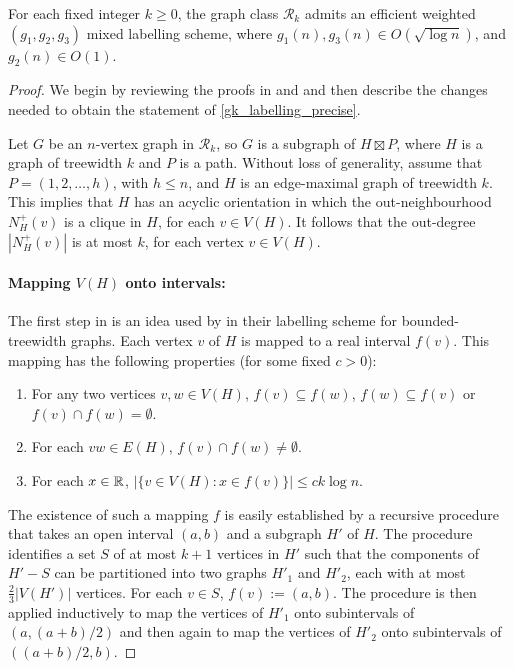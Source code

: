 \documentclass{patmorin}
\renewcommand{\ge}{\geqslant}
\renewcommand{\le}{\leqslant}
\newcommand{\defin}[1]{\emph{\textcolor{brightmaroon}{#1}}}
\newcommand{\Oh}{O}
\begin{document}
\begin{lem}\label{gk_labelling_precise}
  For each fixed integer $k\ge 0$, the graph class $\mathcal{R}_{k}$ admits an efficient weighted $(g_1,g_2,g_3)$ mixed labelling scheme, where $g_1(n),g_3(n)\in \Oh(\sqrt{\log n})$, and $g_2(n)\in \Oh(1)$.
\end{lem}

\begin{proof}
  We begin by reviewing the proofs in \cite{dujmovic.esperet.ea:adjacency} and \cite{gawrychowski.janczewski:simpler} and then describe the changes needed to obtain the statement of \cref{gk_labelling_precise}.

  Let $G$ be an $n$-vertex graph in $\mathcal{R}_k$, so $G$ is a subgraph of $H\boxtimes P$, where $H$ is a graph of treewidth $k$ and $P$ is a path. Without loss of generality, assume that $P=(1,2,\dots,h)$, with $h\le n$, and $H$ is an edge-maximal graph of treewidth $k$.  This implies that $H$ has an acyclic orientation in which the out-neighbourhood \defin{$N^+_H(v)$} is a clique in $H$, for each $v\in V(H)$. It follows that the out-degree $|N^+_H(v)|$ is at most $k$, for each vertex $v\in V(H)$.

  \paragraph{\boldmath Mapping $V(H)$ onto intervals:}
  The first step in \cite{dujmovic.esperet.ea:adjacency} is an idea used by \citet{gavoille.labourel:shorter} in their labelling scheme for bounded-treewidth graphs.
  Each vertex $v$ of $H$ is mapped to a real interval \defin{$f(v)$}.
  This mapping has the following properties (for some fixed $c>0$):
  \begin{enumerate}[nosep,label=(I\arabic*)]
    \item\label{nested_or_disjoint} For any two vertices $v,w\in V(H)$, $f(v)\subseteq f(w)$, $f(w)\subseteq f(v)$ or $f(v)\cap f(w)=\emptyset$.
    \item\label{intersection_subgraph} For each $vw\in E(H)$, $f(v)\cap f(w)\neq\emptyset$.
    \item\label{thin} For each $x\in \mathbb{R}$, $|\{v\in V(H):x\in f(v)\}|\le ck\log n$.
  \end{enumerate}

  The existence of such a mapping $f$ is easily established by a recursive procedure that takes an open interval $(a,b)$ and a subgraph $H'$ of $H$.
  The procedure identifies a set $S$ of at most $k+1$ vertices in $H'$ such that the components of $H'-S$ can be partitioned into two graphs $H'_1$ and $H'_2$, each with at most $\tfrac{2}{3}|V(H')|$ vertices.
  For each $v\in S$, $f(v):=(a,b)$.  The procedure is then applied inductively to map the vertices of $H'_1$ onto subintervals of $(a,(a+b)/2)$ and then again to map the vertices of $H'_2$ onto subintervals of $((a+b)/2,b)$.


\end{proof}
\end{document}
